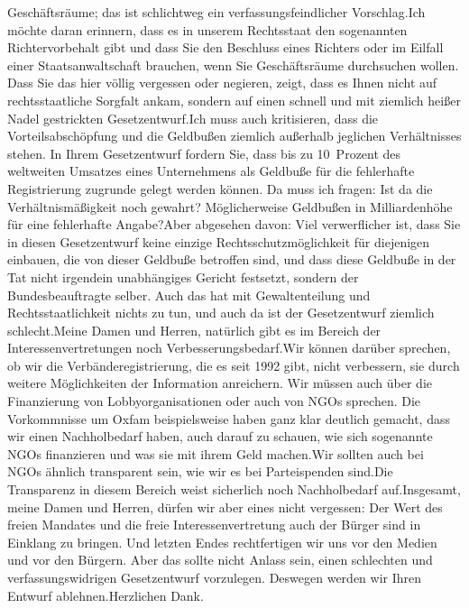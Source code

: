 \documentclass{article}
\begin{document}
Geschäftsräume; das ist schlichtweg ein verfassungsfeindlicher Vorschlag.Ich möchte daran erinnern, dass es in unserem Rechtsstaat den sogenannten Richtervorbehalt gibt und dass Sie den Beschluss eines Richters oder im Eilfall einer Staatsanwaltschaft brauchen, wenn Sie Geschäftsräume durchsuchen wollen. Dass Sie das hier völlig vergessen oder negieren, zeigt, dass es Ihnen nicht auf rechtsstaatliche Sorgfalt ankam, sondern auf einen schnell und mit ziemlich heißer Nadel gestrickten Gesetzentwurf.Ich muss auch kritisieren, dass die Vorteilsabschöpfung und die Geldbußen ziemlich außerhalb jeglichen Verhältnisses stehen. In Ihrem Gesetzentwurf fordern Sie, dass bis zu 10 Prozent des weltweiten Umsatzes eines Unternehmens als Geldbuße für die fehlerhafte Registrierung zugrunde gelegt werden können. Da muss ich fragen: Ist da die Verhältnismäßigkeit noch gewahrt? Möglicherweise Geldbußen in Milliardenhöhe für eine fehlerhafte Angabe?Aber abgesehen davon: Viel verwerflicher ist, dass Sie in diesen Gesetzentwurf keine einzige Rechtsschutzmöglichkeit für diejenigen einbauen, die von dieser Geldbuße betroffen sind, und dass diese Geldbuße in der Tat nicht irgendein unabhängiges Gericht festsetzt, sondern der Bundesbeauftragte selber. Auch das hat mit Gewaltenteilung und Rechtsstaatlichkeit nichts zu tun, und auch da ist der Gesetzentwurf ziemlich schlecht.Meine Damen und Herren, natürlich gibt es im Bereich der Interessenvertretungen noch Verbesserungsbedarf.Wir können darüber sprechen, ob wir die Verbänderegistrierung, die es seit 1992 gibt, nicht verbessern, sie durch weitere Möglichkeiten der Information anreichern. Wir müssen auch über die Finanzierung von Lobbyorganisationen oder auch von NGOs sprechen. Die Vorkommnisse um Oxfam beispielsweise haben ganz klar deutlich gemacht, dass wir einen Nachholbedarf haben, auch darauf zu schauen, wie sich sogenannte NGOs finanzieren und was sie mit ihrem Geld machen.Wir sollten auch bei NGOs ähnlich transparent sein, wie wir es bei Parteispenden sind.Die Transparenz in diesem Bereich weist sicherlich noch Nachholbedarf auf.Insgesamt, meine Damen und Herren, dürfen wir aber eines nicht vergessen: Der Wert des freien Mandates und die freie Interessenvertretung auch der Bürger sind in Einklang zu bringen. Und letzten Endes rechtfertigen wir uns vor den Medien und vor den Bürgern. Aber das sollte nicht Anlass sein, einen schlechten und verfassungswidrigen Gesetzentwurf vorzulegen. Deswegen werden wir Ihren Entwurf ablehnen.Herzlichen Dank.
\end{document}
